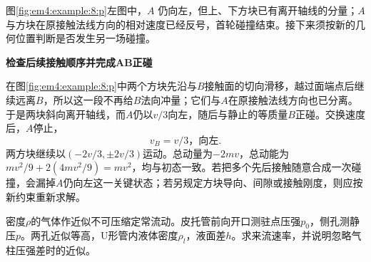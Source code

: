 \begin{solution}
图\ref{fig:em4:example:8:p}左图中，$A$ 仍向左，但上、下方块已有离开轴线的分量；$A$ 与方块在原接触法线方向的相对速度已经反号，首轮碰撞结束。接下来须按新的几何位置判断是否发生另一场碰撞。



\par\medskip{}\noindent\textbf{检查后续接触顺序并完成AB正碰}\par\nobreak
在图\ref{fig:em4:example:8:p}中两个方块先沿与$B$接触面的切向滑移，越过面端点后继续远离$B$，所以这一段不再给$B$法向冲量；它们与$A$在原接触法线方向也已分离。于是两块斜向离开轴线，而$A$仍以$v/3$向左，随后与静止的等质量$B$正碰。交换速度后，$A$停止，
\[\boxed{v_B=v/3\text{，向左}}.\]
两方块继续以$(-2v/3,\pm2v/3)$运动。总动量为$-2mv$，总动能为$mv^2/9+2(4mv^2/9)=mv^2$，均与初态一致。若把多个先后接触随意合成一次碰撞，会漏掉$A$仍向左这一关键状态；若另规定方块导向、间隙或接触刚度，则应按新约束重新求解。\end{solution}
\begin{question}\begin{example}[皮托管的流速测量]\label{em4:example:9}
密度$\rho$的气体作近似不可压缩定常流动。皮托管前向开口测驻点压强$p_0$，侧孔测静压$p$。两孔近似等高，U形管内液体密度$\rho_l$，液面差$h$。求来流速率，并说明忽略气柱压强差时的近似。
\end{example}
\end{question}
